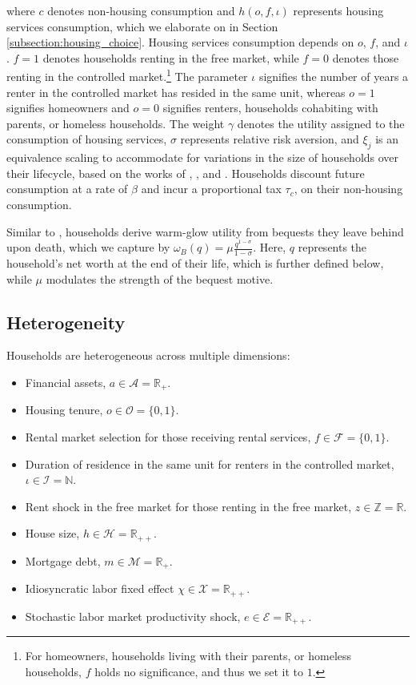 \documentclass[parskip=full]{article}
\begin{document}
\noindent where $c$ denotes non-housing consumption and $h(o,f,\iota)$ represents housing services consumption, which we elaborate on in Section \ref{subsection:housing_choice}. Housing services consumption depends on $o$, $f$, and $\iota$. $f=1$ denotes households renting in the free market, while $f=0$ denotes those renting in the controlled market.\footnote{For homeowners, households living with their parents, or homeless households, $f$ holds no significance, and thus we set it to $1$.} The parameter $\iota$ signifies the number of years a renter in the controlled market has resided in the same unit, whereas $o=1$ signifies homeowners and $o=0$ signifies renters, households cohabiting with parents, or homeless households. The weight $\gamma$ denotes the utility assigned to the consumption of housing services, $\sigma$ represents relative risk aversion, and $\xi_{j}$ is an equivalence scaling to accommodate for variations in the size of households over their lifecycle, based on the works of \citet{lm-1980}, \citet{wz-2010}, and \citet{xu-2013}. Households discount future consumption at a rate of $\beta$ and incur a proportional tax $\tau_{c}$, on their non-housing consumption.

Similar to \citet{cagetti-denardi-2006}, households derive warm-glow utility from bequests they leave behind upon death, which we capture by $\omega_{B}(q)=\mu \frac{q^{1-\sigma}}{1-\sigma}$. Here, $q$ represents the household's net worth at the end of their life, which is further defined below, while $\mu$ modulates the strength of the bequest motive.

\subsection{Heterogeneity}

Households are heterogeneous across multiple dimensions:

\begin{itemize}
    \item Financial assets, $a\in \mathcal{A}=\mathbb{R}_{+}$.
    \item Housing tenure, $o \in \mathcal{O}=\{0,1\}$.
    \item Rental market selection for those receiving rental services, $f \in \mathcal{F}=\{0,1\}$.
    \item Duration of residence in the same unit for renters in the controlled market, $\iota \in \mathcal{I}=\mathbb{N}$.
    \item Rent shock in the free market for those renting in the free market, $z \in \mathbb{Z}=\mathbb{R}$.
    \item House size, $h\in \mathcal{H}=\mathbb{R}_{++}$.
    \item Mortgage debt, $m \in \mathcal{M}=\mathbb{R}_{+}$.
    \item Idiosyncratic labor fixed effect $\chi \in \mathcal{X}=\mathbb{R}_{++}$.
    \item Stochastic labor market productivity shock, $e \in \mathcal{E} = \mathbb{R}_{++}$.
\end{itemize}
 
\end{document}
